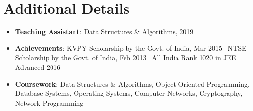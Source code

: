 \documentclass[a4paper,11pt]{article}
\newcommand{\resumeItem}[2]{
  \item\small{
    \textbf{#1}{: #2 \vspace{-1pt}}
  }
}
\newcommand{\resumeItemListStart}{\begin{itemize}}
\newcommand{\resumeItemListEnd}{\end{itemize}\vspace{-2pt}}
\begin{document}
\section{Additional Details}
\resumeItemListStart
\resumeItem{Teaching Assistant}{Data Structures \& Algorithms, 2019}
\resumeItem{Achievements}{KVPY Scholarship by the Govt. of India, Mar 2015 \textbar\ NTSE Scholarship by the Govt. of India, Feb 2013 \textbar\ All India Rank 1020 in JEE Advanced 2016}
\resumeItem{Coursework}{Data Structures \& Algorithms, Object Oriented Programming, Database Systems, Operating Systems, Computer Networks, Cryptography, Network Programming}
\resumeItemListEnd

\end{document}
